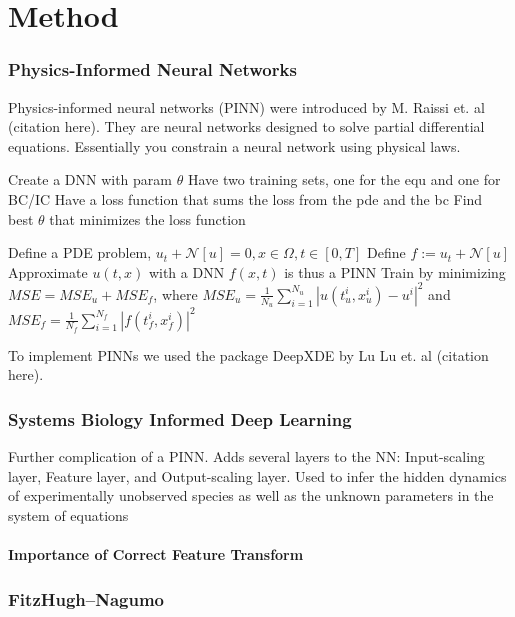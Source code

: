 \chapter{Method}
\label{sec:method}

\subsection{Physics-Informed Neural Networks}

Physics-informed neural networks (PINN) were introduced by M. Raissi et. al (citation here). 
They are neural networks designed to solve partial differential equations. 
Essentially you constrain a neural network using physical laws.

Create a DNN with param $\theta$
Have two training sets, one for the equ and one for BC/IC
Have a loss function that sums the loss from the pde and the bc
Find best $\theta$ that minimizes the loss function

Define a PDE problem, $u_{t}+\mathcal{N}[u]=0, x \in \Omega, t \in[0, T]$
Define $f:=u_{t}+\mathcal{N}[u]$
Approximate $u(t,x)$ with a DNN
$f(x,t)$ is thus a PINN 
Train by minimizing $M S E=M S E_{u}+M S E_{f}$, where $M S E_{u}=\frac{1}{N_{u}} \sum_{i=1}^{N_{u}}\left|u\left(t_{u}^{i}, x_{u}^{i}\right)-u^{i}\right|^{2}$ and $M S E_{f}=\frac{1}{N_{f}} \sum_{i=1}^{N_{f}}\left|f\left(t_{f}^{i}, x_{f}^{i}\right)\right|^{2}$

To implement PINNs we used the package DeepXDE by Lu Lu et. al (citation here). 


\subsection{Systems Biology Informed Deep Learning}

Further complication of a PINN. 
Adds several layers to the NN: Input-scaling layer, Feature layer, and Output-scaling layer.
Used to infer the hidden dynamics of experimentally unobserved species as well as the unknown parameters in the system of equations


\subsubsection{Importance of Correct Feature Transform}





\subsection{FitzHugh–Nagumo}

